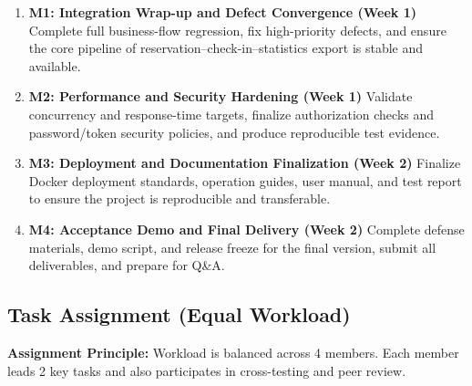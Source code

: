 \begin{enumerate}
  \item \textbf{M1: Integration Wrap-up and Defect Convergence (Week 1)}
  Complete full business-flow regression, fix high-priority defects, and ensure the core pipeline of reservation--check-in--statistics export is stable and available.

  \item \textbf{M2: Performance and Security Hardening (Week 1)}
  Validate concurrency and response-time targets, finalize authorization checks and password/token security policies, and produce reproducible test evidence.

  \item \textbf{M3: Deployment and Documentation Finalization (Week 2)}
  Finalize Docker deployment standards, operation guides, user manual, and test report to ensure the project is reproducible and transferable.

  \item \textbf{M4: Acceptance Demo and Final Delivery (Week 2)}
  Complete defense materials, demo script, and release freeze for the final version, submit all deliverables, and prepare for Q\&A.
\end{enumerate}

\subsection{Task Assignment (Equal Workload)}

\noindent\textbf{Assignment Principle:} Workload is balanced across 4 members. Each member leads 2 key tasks and also participates in cross-testing and peer review.


